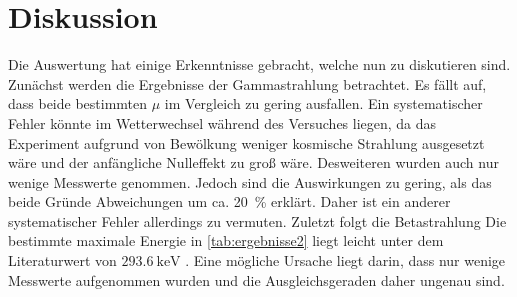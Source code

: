 
\section{Diskussion}
\label{sec:Diskussion}
Die Auswertung hat einige Erkenntnisse gebracht, welche nun zu diskutieren sind.
Zunächst werden die Ergebnisse der Gammastrahlung betrachtet. Es fällt auf, dass
 beide bestimmten $\mu$ im Vergleich zu gering ausfallen. Ein systematischer Fehler
 könnte im Wetterwechsel während des Versuches liegen, da das Experiment aufgrund von Bewölkung
  weniger kosmische Strahlung ausgesetzt wäre und der anfängliche Nulleffekt zu groß wäre.
Desweiteren wurden auch nur wenige Messwerte genommen.
  Jedoch sind die Auswirkungen zu gering, als das beide Gründe Abweichungen um ca. \SI{20}{\percent} erklärt.
  Daher ist ein anderer systematischer Fehler allerdings zu vermuten.
  Zuletzt folgt die Betastrahlung
Die bestimmte maximale Energie in \ref{tab:ergebnisse2} liegt leicht unter dem Literaturwert von $\SI{293.6}{\kilo\electronvolt}$ \cite{bet}.
Eine mögliche Ursache liegt darin, dass nur wenige Messwerte aufgenommen wurden und die Ausgleichsgeraden daher ungenau sind.
